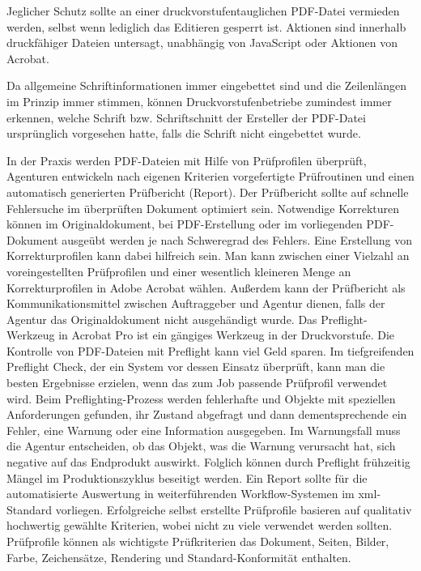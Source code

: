 Jeglicher Schutz sollte an einer druckvorstufentauglichen PDF-Datei vermieden werden, selbst wenn lediglich das Editieren gesperrt ist. Aktionen sind innerhalb druckfähiger Dateien untersagt, unabhängig von JavaScript oder Aktionen von Acrobat. \cite{schneeberger}

Da allgemeine Schriftinformationen immer eingebettet sind und die Zeilenlängen im Prinzip immer stimmen, können Druckvorstufenbetriebe zumindest immer erkennen, welche Schrift bzw. Schriftschnitt der Ersteller der PDF-Datei ursprünglich vorgesehen hatte, falls die Schrift nicht eingebettet wurde. \cite{schneeberger}

In der Praxis werden PDF-Dateien mit Hilfe von Prüfprofilen überprüft, Agenturen entwickeln nach eigenen Kriterien vorgefertigte Prüfroutinen und einen automatisch generierten Prüfbericht (Report). Der Prüfbericht sollte auf schnelle Fehlersuche im überprüften Dokument optimiert sein. Notwendige Korrekturen können im Originaldokument, bei PDF-Erstellung oder im vorliegenden PDF-Dokument ausgeübt werden je nach Schweregrad des Fehlers. Eine Erstellung von Korrekturprofilen kann dabei hilfreich sein. Man kann zwischen einer Vielzahl an voreingestellten Prüfprofilen und einer wesentlich kleineren Menge an Korrekturprofilen in Adobe Acrobat wählen. Außerdem kann der Prüfbericht als Kommunikationsmittel zwischen Auftraggeber und Agentur dienen, falls der Agentur das Originaldokument nicht ausgehändigt wurde. Das Preflight-Werkzeug in Acrobat Pro ist ein gängiges Werkzeug in der Druckvorstufe. Die Kontrolle von PDF-Dateien mit Preflight kann viel Geld sparen. Im tiefgreifenden Preflight Check, der ein System vor dessen Einsatz überprüft, kann man die besten Ergebnisse erzielen, wenn das zum Job passende Prüfprofil verwendet wird. Beim Preflighting-Prozess werden fehlerhafte und Objekte mit speziellen Anforderungen gefunden, ihr Zustand abgefragt und dann dementsprechende ein Fehler, eine Warnung oder eine Information ausgegeben. Im Warnungsfall muss die Agentur entscheiden, ob das Objekt, was die Warnung verursacht hat, sich negative auf das Endprodukt auswirkt. Folglich können durch Preflight frühzeitig Mängel im Produktionszyklus beseitigt werden. Ein Report sollte für die automatisierte Auswertung in weiterführenden Workflow-Systemen im \gls{xml}-Standard vorliegen. Erfolgreiche selbst erstellte Prüfprofile basieren auf qualitativ hochwertig gewählte Kriterien, wobei nicht zu viele verwendet werden sollten. Prüfprofile können als wichtigste Prüfkriterien das Dokument, Seiten, Bilder, Farbe, Zeichensätze, Rendering und Standard-Konformität enthalten. 
\cite{schneeberger}

